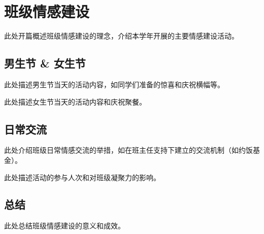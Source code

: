 \section{班级情感建设}

此处开篇概述班级情感建设的理念，介绍本学年开展的主要情感建设活动。

\subsection{男生节 \& 女生节}

此处描述男生节当天的活动内容，如同学们准备的惊喜和庆祝横幅等。



此处描述女生节当天的活动内容和庆祝聚餐。


\subsection{日常交流}

此处介绍班级日常情感交流的举措，如在班主任支持下建立的交流机制（如约饭基金）。

此处描述活动的参与人次和对班级凝聚力的影响。


\subsection{总结}

此处总结班级情感建设的意义和成效。

